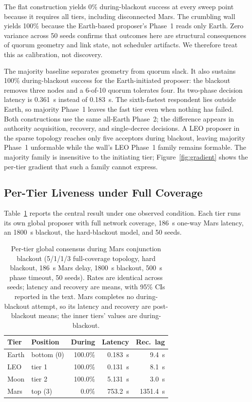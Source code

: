 \documentclass[letterpaper,twocolumn,10pt]{article}
\newcounter{prop}
\begin{document}
The flat construction yields 0\% during-blackout success at every sweep point because it requires all tiers, including disconnected Mars. The crumbling wall yields 100\% because the Earth-based proposer's Phase~1 reads only Earth. Zero variance across 50 seeds confirms that outcomes here are structural consequences of quorum geometry and link state, not scheduler artifacts. We therefore treat this as calibration, not discovery.

The majority baseline separates geometry from quorum slack. It also sustains 100\% during-blackout success for the Earth-initiated proposer: the blackout removes three nodes and a 6-of-10 quorum tolerates four. Its two-phase decision latency is 0.361~s instead of 0.183~s. The sixth-fastest respondent lies outside Earth, so majority Phase~1 leaves the fast tier even when nothing has failed. Both constructions use the same all-Earth Phase~2; the difference appears in authority acquisition, recovery, and single-decree decisions. A LEO proposer in the sparse topology reaches only five acceptors during blackout, leaving majority Phase~1 unformable while the wall's LEO Phase~1 family remains formable. The majority family is insensitive to the initiating tier; Figure~\ref{fig:gradient} shows the per-tier gradient that such a family cannot express.

\subsection{Per-Tier Liveness under Full Coverage}

Table~\ref{tab:pertier} reports the central result under one observed condition. Each tier runs its own global proposer with full network coverage, 186~s one-way Mars latency, an 1800~s blackout, the hard-blackout model, and 50 seeds.

\begin{table}[t]
\centering
\small
\caption{Per-tier global consensus during Mars conjunction blackout (5/1/1/3 full-coverage topology, hard blackout, 186~s Mars delay, 1800~s blackout, 500~s phase timeout, 50 seeds). Rates are identical across seeds; latency and recovery are means, with 95\% CIs reported in the text. Mars completes no during-blackout attempt, so its latency and recovery are post-blackout means; the inner tiers' values are during-blackout.}
\label{tab:pertier}
\begin{tabular}{llrrr}
\toprule
Tier & Position & During & Latency & Rec.\ lag \\
\midrule
Earth & bottom (0) & 100.0\% & 0.183~s & 9.4~s \\
LEO & tier 1 & 100.0\% & 0.131~s & 8.1~s \\
Moon & tier 2 & 100.0\% & 5.131~s & 3.0~s \\
Mars & top (3) & 0.0\% & 753.2~s & 1351.4~s \\
\bottomrule
\end{tabular}
\end{table}
\end{document}
